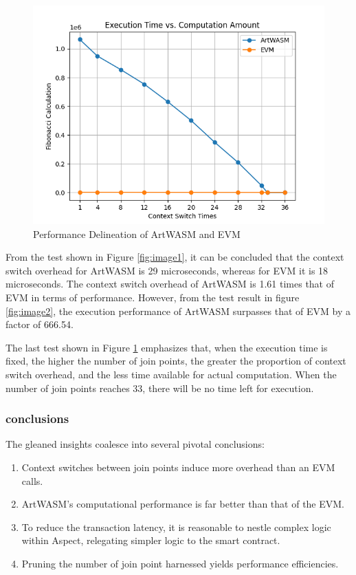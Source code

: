\begin{figure}[htp]
\begin{minipage}{0.3\textwidth}
    \centering
    \includegraphics[width=1\linewidth]{sections/tx-latency-na-vs-jpc.png}
    \caption{Performance Delineation of ArtWASM and EVM}
    \label{fig:image3}
  \end{minipage}
\end{figure}

From the test shown in Figure \ref{fig:image1}, it can be concluded that the context switch overhead for ArtWASM is 29 microseconds, whereas for EVM it is 18 microseconds. The context switch overhead of ArtWASM is 1.61 times that of EVM in terms of performance. However, from the test result in figure \ref{fig:image2}, the execution performance of ArtWASM surpasses that of EVM by a factor of 666.54.

The last test shown in Figure \ref{fig:image3} emphasizes that, when the execution time is fixed, the higher the number of join points, the greater the proportion of context switch overhead, and the less time available for actual computation. When the number of join points reaches 33, there will be no time left for execution.

\subsubsection{conclusions}
The gleaned insights coalesce into several pivotal conclusions:

\begin{enumerate}
  \item Context switches between join points induce more overhead than an EVM calls.
  \item ArtWASM's computational performance is far better than that of the EVM.
  \item To reduce the transaction latency, it is reasonable to nestle complex logic within Aspect, relegating simpler logic to the smart contract.
  \item Pruning the number of join point harnessed yields performance efficiencies.
\end{enumerate}

